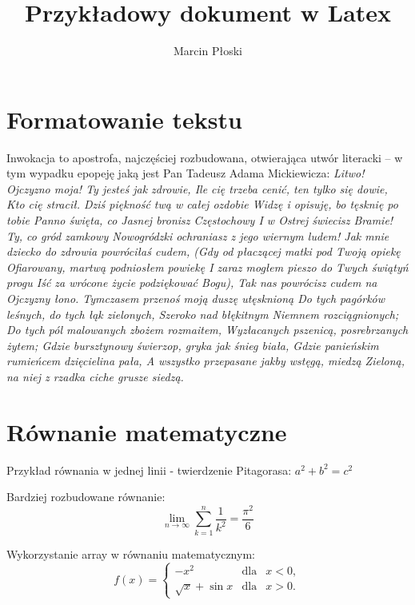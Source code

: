 \documentclass[11pt,twoside,a4paper]{article}
\author{Marcin Płoski}
\begin{document}
\title{Przykładowy dokument w Latex}
\maketitle

\section{Formatowanie tekstu}
	Inwokacja to apostrofa, najczęściej rozbudowana, otwierająca utwór literacki – w tym wypadku epopeję jaką jest Pan Tadeusz Adama Mickiewicza:	
	\textsl{Litwo! Ojczyzno moja! Ty jesteś jak zdrowie,
Ile cię trzeba cenić, ten tylko się dowie,
Kto cię stracił. Dziś piękność twą w całej ozdobie
Widzę i opisuję, bo tęsknię po tobie
Panno święta, co Jasnej bronisz Częstochowy
I w Ostrej świecisz Bramie! Ty, co gród zamkowy
Nowogródzki ochraniasz z jego wiernym ludem!
Jak mnie dziecko do zdrowia powróciłaś cudem,
(Gdy od płaczącej matki pod Twoją opiekę
Ofiarowany, martwą podniosłem powiekę
I zaraz mogłem pieszo do Twych świątyń progu
Iść za wrócone życie podziękować Bogu),
Tak nas powrócisz cudem na Ojczyzny łono.
Tymczasem przenoś moją duszę utęsknioną
Do tych pagórków leśnych, do tych łąk zielonych,
Szeroko nad błękitnym Niemnem rozciągnionych;
Do tych pól malowanych zbożem rozmaitem,\newline
Wyzłacanych pszenicą, posrebrzanych żytem;
Gdzie bursztynowy świerzop, gryka jak śnieg biała,
Gdzie panieńskim rumieńcem dzięcielina pała,
A wszystko przepasane jakby wstęgą, miedzą
Zieloną, na niej z rzadka ciche grusze siedzą.}

\section{Równanie matematyczne}
\begin{center}
Przykład równania w jednej linii - twierdzenie Pitagorasa:\newline
$a^2 + b^2 = c^2$
\end{center}

\begin{center}
Bardziej rozbudowane równanie:\newline
\begin{equation*}
\lim_{n \to \infty}
\sum_{k=1}^n \frac{1}{k^2}
= \frac{\pi^2}{6}
\end{equation*}
\end{center}

\begin{center}
Wykorzystanie array w równaniu matematycznym:
\begin{equation*}
\label{eq:funkcjaf}
f(x) = \left\lbrace
\begin{array}{rcl}
-x^2 & \text{dla} & x < 0,\\
\sqrt{x} + \sin x & \text{dla} & x > 0.
\end{array}
\right.
\end{equation*}
\end{center}
\end{document}
